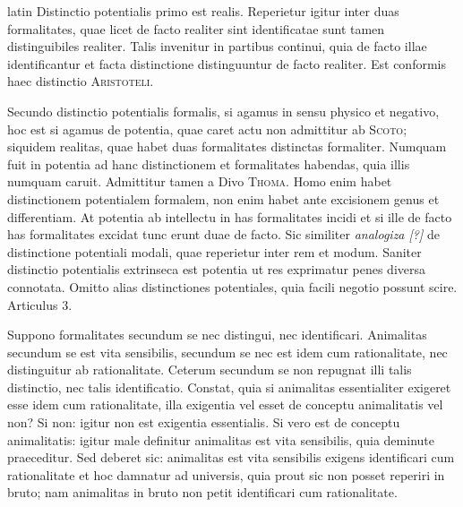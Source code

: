 \begin{otherlanguage*}{latin}
\pstart
Distinctio potentialis primo est realis. Reperietur igitur inter duas formalitates, quae licet de facto realiter sint identificatae sunt tamen distinguibiles realiter. Talis invenitur in partibus continui, quia de facto illae identificantur et facta distinctione distinguuntur de facto realiter. Est conformis haec distinctio \textsc{Aristoteli}. 
\pend

\pstart
Secundo distinctio potentialis formalis, si agamus in sensu physico et negativo, hoc est si agamus de potentia, quae caret actu non admittitur ab \textsc{Scoto}; siquidem realitas, quae habet duas formalitates distinctas formaliter. Numquam fuit in potentia ad hanc distinctionem et formalitates habendas, quia illis numquam caruit. Admittitur tamen a Divo \textsc{Thoma}. Homo enim habet distinctionem potentialem formalem, non enim habet ante excisionem genus et differentiam. At potentia ab intellectu in has formalitates incidi et si ille de facto has formalitates excidat tunc erunt duae de facto. Sic similiter \emph{analogiza [?]} de distinctione potentiali modali, quae reperietur inter rem et modum. Saniter distinctio potentialis extrinseca est potentia ut res exprimatur penes diversa connotata. Omitto alias distinctiones potentiales, quia facili negotio possunt scire. Articulus 3. 
\pend

\pstart
{}
\pend

\pstart
Suppono formalitates secundum se nec distingui, nec identificari. Animalitas secundum se est vita sensibilis, secundum se nec est idem cum rationalitate, nec distinguitur ab rationalitate. Ceterum secundum se non repugnat illi talis distinctio, nec talis identificatio. Constat, quia si animalitas essentialiter exigeret esse idem cum rationalitate, illa exigentia vel esset de conceptu animalitatis vel non? Si non:
igitur non est exigentia essentialis. Si vero est de conceptu animalitatis:
igitur male definitur animalitas est vita sensibilis, quia deminute praeceditur. Sed deberet sic:
animalitas est vita sensibilis exigens identificari cum rationalitate et hoc damnatur ad universis, quia prout sic non posset reperiri in bruto; nam animalitas in bruto non petit identificari cum rationalitate. 
\pend


\end{otherlanguage*}
